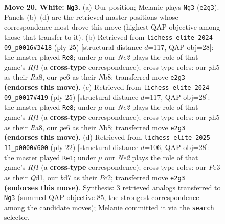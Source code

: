 \documentclass[11pt]{article}
\begin{document}
\begin{figure}[p]
\caption{\textbf{Move 20, White: \texttt{Ng3}.} (a) Our position; Melanie plays \texttt{Ng3} (\texttt{e2g3}). Panels (b)--(d) are the retrieved master positions whose correspondence most drove this move (highest QAP objective among those that transfer to it). (b) Retrieved from \texttt{lichess\_elite\_2024-09\_p0016\#3418} (ply 25) [structural distance $d$=117, QAP obj=28]: the master played \texttt{Re8}; under $\mu$ our \emph{Ne2} plays the role of that game's \emph{Rf1} (a \textbf{cross-type} correspondence); cross-type roles: our \emph{p}h5 as their \emph{R}a8, our \emph{p}e6 as their \emph{N}b8; transferred move \texttt{e2g3} \textbf{(endorses this move)}. (c) Retrieved from \texttt{lichess\_elite\_2024-09\_p0017\#419} (ply 25) [structural distance $d$=117, QAP obj=28]: the master played \texttt{Re8}; under $\mu$ our \emph{Ne2} plays the role of that game's \emph{Rf1} (a \textbf{cross-type} correspondence); cross-type roles: our \emph{p}h5 as their \emph{R}a8, our \emph{p}e6 as their \emph{N}b8; transferred move \texttt{e2g3} \textbf{(endorses this move)}. (d) Retrieved from \texttt{lichess\_elite\_2025-11\_p0000\#600} (ply 22) [structural distance $d$=106, QAP obj=28]: the master played \texttt{Re1}; under $\mu$ our \emph{Ne2} plays the role of that game's \emph{Rf1} (a \textbf{cross-type} correspondence); cross-type roles: our \emph{P}e3 as their \emph{Q}d1, our \emph{b}d7 as their \emph{P}c2; transferred move \texttt{e2g3} \textbf{(endorses this move)}. Synthesis: 3 retrieved analogs transferred to \texttt{Ng3} (summed QAP objective 85, the strongest correspondence among the candidate moves); Melanie committed it via the \texttt{search} selector.}
\label{fig:thought-m38}
\end{figure}

\clearpage
\end{document}
